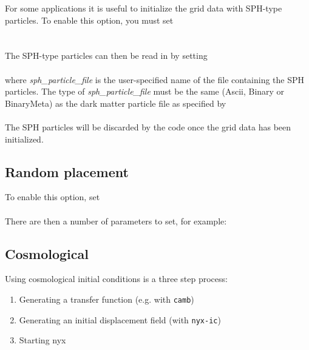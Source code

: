For some applications it is useful to initialize the grid data with SPH-type
particles.   To enable this option, you must set \\

 \\
 \\

\noindent The SPH-type particles can then be read in by setting \\

 \\

\noindent where {\em sph\_particle\_file} is the user-specified name of the file
containing the SPH particles.  The type of {\em sph\_particle\_file} 
must be the same (Ascii, Binary or BinaryMeta) as the dark matter particle 
file as specified by   \\

 \\

\noindent The SPH particles will be discarded by the code once the grid data has been initialized.

\subsection{Random placement}

To enable this option, set \\

 \\

\noindent There are then a number of parameters to set, for example: \\




\subsection{Cosmological}

Using cosmological initial conditions is a three step process:
\begin{enumerate}
	\item Generating a transfer function (e.g. with \texttt{camb})
	\item Generating an initial displacement field (with \texttt{nyx-ic})
	\item Starting nyx
\end{enumerate}

